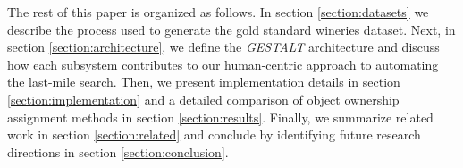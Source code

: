 The rest of this paper is organized as follows. In section \ref{section:datasets} we describe the process used to generate the gold standard wineries dataset. Next, in section \ref{section:architecture}, we define the \emph{GESTALT} architecture and discuss how each subsystem contributes to our human-centric approach to automating the last-mile search. Then, we present implementation details in section \ref{section:implementation} and a detailed comparison of object ownership assignment methods in section \ref{section:results}. Finally, we summarize related work in section \ref{section:related} and conclude by identifying future research directions in section \ref{section:conclusion}.  %






